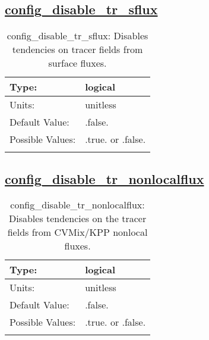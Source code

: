 \subsection[config\_disable\_tr\_sflux]{\hyperref[sec:nm_tab_debug]{config\_disable\_tr\_sflux}}
\label{subsec:nm_sec_config_disable_tr_sflux}
\begin{center}
\begin{longtable}{| p{2.0in} || p{4.0in} |}
    \hline
    Type: & logical \\
    \hline
    Units: & \si{unitless} \\
    \hline
    Default Value: & .false. \\
    \hline
    Possible Values: & .true. or .false. \\
    \hline
    \caption{config\_disable\_tr\_sflux: Disables tendencies on tracer fields from surface fluxes.}
\end{longtable}
\end{center}
\subsection[config\_disable\_tr\_nonlocalflux]{\hyperref[sec:nm_tab_debug]{config\_disable\_tr\_nonlocalflux}}
\label{subsec:nm_sec_config_disable_tr_nonlocalflux}
\begin{center}
\begin{longtable}{| p{2.0in} || p{4.0in} |}
    \hline
    Type: & logical \\
    \hline
    Units: & \si{unitless} \\
    \hline
    Default Value: & .false. \\
    \hline
    Possible Values: & .true. or .false. \\
    \hline
    \caption{config\_disable\_tr\_nonlocalflux: Disables tendencies on the tracer fields from CVMix/KPP nonlocal fluxes.}
\end{longtable}
\end{center}
